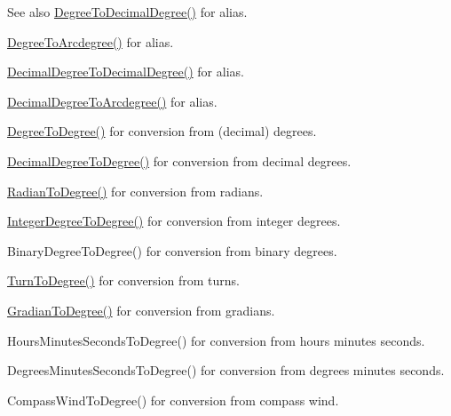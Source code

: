 \begin{DoxySeeAlso}{See also}
\mbox{\hyperlink{group___e_g_x_math-_angle_conversions-_degree_ga568afc1d436d425bf5d4edea584aee08}{Degree\+To\+Decimal\+Degree()}} for alias. 

\mbox{\hyperlink{group___e_g_x_math-_angle_conversions-_degree_gac1b5f3b68f66c77a6df4ceef842c9b19}{Degree\+To\+Arcdegree()}} for alias. 

\mbox{\hyperlink{group___e_g_x_math-_angle_conversions-_decimal_degree_gafccf9cd779903872887978ab9d79661f}{Decimal\+Degree\+To\+Decimal\+Degree()}} for alias. 

\mbox{\hyperlink{group___e_g_x_math-_angle_conversions-_decimal_degree_gacdd463fcabffeb598ebda65b012ce743}{Decimal\+Degree\+To\+Arcdegree()}} for alias. 

\mbox{\hyperlink{group___e_g_x_math-_angle_conversions-_degree_gaca157e7d3e99a46a11a04b92680d2574}{Degree\+To\+Degree()}} for conversion from (decimal) degrees. 

\mbox{\hyperlink{group___e_g_x_math-_angle_conversions-_decimal_degree_ga0aa7f2f5dbb00cf4ab303421c6e33ccf}{Decimal\+Degree\+To\+Degree()}} for conversion from decimal degrees. 

\mbox{\hyperlink{group___e_g_x_math-_angle_conversions-_radian_ga25bbce6cdc1c3621f2a158d320e3bc45}{Radian\+To\+Degree()}} for conversion from radians. 

\mbox{\hyperlink{group___e_g_x_math-_angle_conversions-_integer_degree_gaa9b63c6095fd7f8809fcfa2ba1e62235}{Integer\+Degree\+To\+Degree()}} for conversion from integer degrees. 

Binary\+Degree\+To\+Degree() for conversion from binary degrees. 

\mbox{\hyperlink{group___e_g_x_math-_angle_conversions-_turn_ga19eceb6db54a1cf17789639c2a869cb9}{Turn\+To\+Degree()}} for conversion from turns. 

\mbox{\hyperlink{group___e_g_x_math-_angle_conversions-_gradian_gaa284952274f16d225951cf5139d0ff4e}{Gradian\+To\+Degree()}} for conversion from gradians. 

Hours\+Minutes\+Seconds\+To\+Degree() for conversion from hours minutes seconds. 

Degrees\+Minutes\+Seconds\+To\+Degree() for conversion from degrees minutes seconds. 

Compass\+Wind\+To\+Degree() for conversion from compass wind. 
\end{DoxySeeAlso}
\mbox{\label{group___e_g_x_math-_angle_conversions-_degree_ga859585939255d52d010c780c68eb6e23}} 
